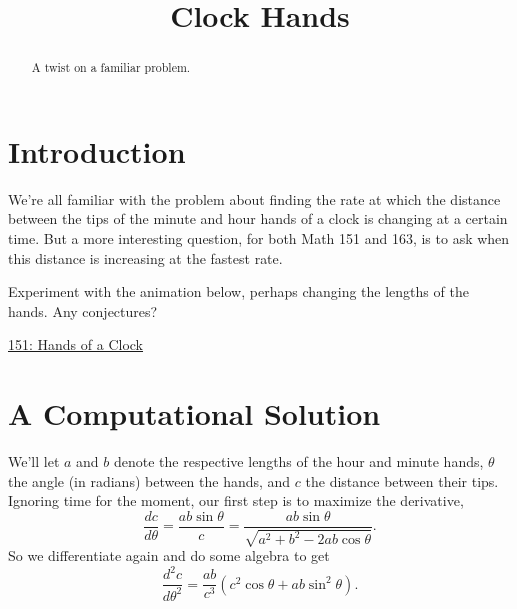 \documentclass{ximera}
\title{Clock Hands}
\begin{document}
\begin{abstract}
A twist on a familiar problem.
\end{abstract}
\maketitle

\section*{Introduction}
We're all familiar with the problem about finding the rate at which the distance between the tips of the minute and hour hands of a clock is changing at a certain time. But a more interesting question, for both Math 151 and 163, is to ask when this distance is increasing at the fastest rate. 


\begin{exploration}
Experiment with the animation below, perhaps changing the lengths of the hands. Any conjectures?

\begin{onlineOnly}
    \begin{center}
\end{center}
\end{onlineOnly}

\href{https://www.desmos.com/calculator/qvk0mzy26u}{151: Hands of a Clock}


\end{exploration}

\section*{A Computational Solution}

We'll let $a$ and $b$ denote the respective lengths of the hour and minute hands, $\theta$ the angle (in radians) between the hands, and $c$ the distance between their tips. Ignoring time for the moment, our first step is to maximize the derivative,
\[
        \frac{dc}{d\theta} = \frac{ab\sin \theta}{c} = \frac{ab \sin \theta}{\sqrt{a^2+b^2-2ab\cos\theta}}.
\]
So we differentiate again and do some algebra to get
\[
       \frac{d^2c}{d\theta^2} = \frac{ab}{c^3} \left( c^2\cos\theta + ab\sin^2\theta  \right).
\]
\end{document}

